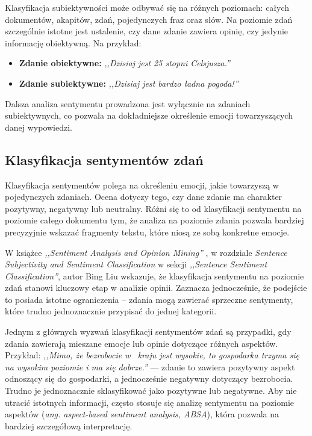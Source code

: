 \documentclass[wmii, inf, mgr]{uwmthesis}
\begin{document}
Klasyfikacja subiektywności może odbywać się na różnych poziomach: całych dokumentów, akapitów, zdań, pojedynczych fraz oraz słów. Na poziomie zdań szczególnie istotne jest ustalenie, czy dane zdanie zawiera opinię, czy jedynie informację obiektywną. Na przykład:
\begin{itemize}
    \item \textbf{Zdanie obiektywne:} \textit{,,Dzisiaj jest 25 stopni Celsjusza.''}
    \item \textbf{Zdanie subiektywne:} \textit{,,Dzisiaj jest bardzo ładna pogoda!''}
\end{itemize}

Dalsza analiza sentymentu prowadzona jest wyłącznie na zdaniach subiektywnych, co pozwala na dokładniejsze określenie emocji towarzyszących danej wypowiedzi.



\subsection{Klasyfikacja sentymentów zdań}
Klasyfikacja sentymentów polega na określeniu emocji, jakie towarzyszą w pojedynczych zdaniach. Ocena dotyczy tego, czy dane zdanie ma charakter pozytywny, negatywny lub neutralny. Różni się to od klasyfikacji sentymentu na poziomie całego dokumentu tym, że analiza na poziomie zdania pozwala bardziej precyzyjnie wskazać fragmenty tekstu, które niosą ze sobą konkretne emocje.

W książce \textit{,,Sentiment Analysis and Opinion Mining''} \cite{SentimentAnalysisandOpinionMining}, w rozdziale \textit{Sentence Subjectivity and Sentiment Classification} w sekcji \textit{,,Sentence Sentiment Classification''}, autor Bing Liu wskazuje, że klasyfikacja sentymentu na poziomie zdań stanowi kluczowy etap w analizie opinii. Zaznacza jednocześnie, że podejście to posiada istotne ograniczenia -- zdania mogą zawierać sprzeczne sentymenty, które trudno jednoznacznie przypisać do jednej kategorii.

Jednym z głównych wyzwań klasyfikacji sentymentów zdań są przypadki, gdy zdania zawierają mieszane emocje lub opinie dotyczące różnych aspektów. Przykład: \textit{,,Mimo, że bezrobocie w~ kraju jest wysokie, to gospodarka trzyma się na wysokim poziomie i ma się dobrze.''} — zdanie to zawiera pozytywny aspekt odnoszący się do gospodarki, a jednocześnie negatywny dotyczący bezrobocia. Trudno je jednoznacznie sklasyfikować jako pozytywne lub negatywne. Aby nie utracić istotnych informacji, często stosuje się analizę sentymentu na poziomie aspektów (\textit{ang. aspect-based sentiment analysis, ABSA}), która pozwala na bardziej szczegółową interpretację.
\end{document}
